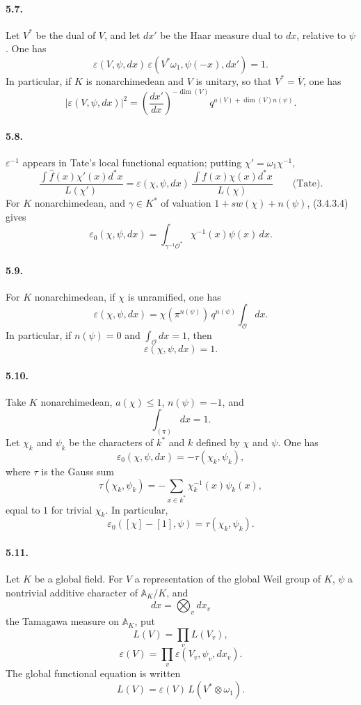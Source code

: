 \documentclass[10pt]{article}
\begin{document}
\paragraph{5.7.} Let \(V^*\) be the dual of \(V\), and let \(dx'\) be the Haar measure dual to \(dx\), relative to \(\psi\). One has
\[
\tag{5.7.1}
\varepsilon(V,\psi,dx)\,
\varepsilon(V^*\omega_1,\psi(-x),dx')=1.
\]
In particular, if \(K\) is nonarchimedean and \(V\) is unitary, so that \(V^*=\overline V\), one has
\[
\tag{5.7.2}
|\varepsilon(V,\psi,dx)|^2
=
\left(\frac{dx'}{dx}\right)^{-\dim(V)}
q^{a(V)+\dim(V)n(\psi)}.
\]

\paragraph{5.8.} \(\varepsilon^{-1}\) appears in Tate's local functional equation; putting \(\chi'=\omega_1\chi^{-1}\),
\[
\tag{5.8.1}
\frac{\displaystyle\int \widehat f(x)\chi'(x)d^*x}{L(\chi')}
=
\varepsilon(\chi,\psi,dx)\,
\frac{\displaystyle\int f(x)\chi(x)d^*x}{L(\chi)}
\qquad\text{(Tate).}
\]
For \(K\) nonarchimedean, and \(\gamma\in K^*\) of valuation \(1+sw(\chi)+n(\psi)\), (3.4.3.4) gives
\[
\tag{5.8.2}
\varepsilon_0(\chi,\psi,dx)
=
\int_{\gamma^{-1}\mathcal O^*}\chi^{-1}(x)\psi(x)\,dx.
\]

\paragraph{5.9.} For \(K\) nonarchimedean, if \(\chi\) is unramified, one has
\[
\varepsilon(\chi,\psi,dx)
=
\chi(\pi^{n(\psi)})\,q^{n(\psi)}
\int_{\mathcal O}dx.
\]
In particular, if \(n(\psi)=0\) and \(\int_{\mathcal O}dx=1\), then
\[
\varepsilon(\chi,\psi,dx)=1.
\]

\paragraph{5.10.} Take \(K\) nonarchimedean, \(a(\chi)\le1\), \(n(\psi)=-1\), and
\[
\int_{(\pi)}dx=1.
\]
Let \(\chi_k\) and \(\psi_k\) be the characters of \(k^*\) and \(k\) defined by \(\chi\) and \(\psi\). One has
\[
\tag{5.10.1}
\varepsilon_0(\chi,\psi,dx)=-\tau(\chi_k,\psi_k),
\]
where \(\tau\) is the Gauss sum
\[
\tag{5.10.2}
\tau(\chi_k,\psi_k)
=
-\sum_{x\in k^*}\chi_k^{-1}(x)\psi_k(x),
\]
equal to \(1\) for trivial \(\chi_k\). In particular,
\[
\tag{5.10.3}
\varepsilon_0([\chi]-[1],\psi)=\tau(\chi_k,\psi_k).
\]




\paragraph{5.11.} Let \(K\) be a global field. For \(V\) a representation of the global Weil group of \(K\), \(\psi\) a nontrivial additive character of \(\mathbb A_K/K\), and
\[
dx=\bigotimes_v dx_v
\]
the Tamagawa measure on \(\mathbb A_K\), put
\[
\tag{5.11.1}
L(V)=\prod_v L(V_v),
\]
\[
\tag{5.11.2}
\varepsilon(V)=\prod_v\varepsilon(V_v,\psi_v,dx_v).
\]
The global functional equation is written
\[
\tag{5.11.3}
L(V)=\varepsilon(V)\,L(V^*\otimes\omega_1).
\]
\end{document}
